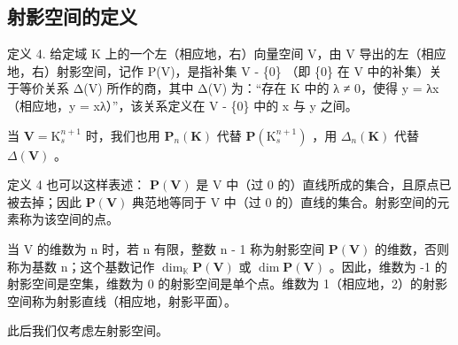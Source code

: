 \subsection{射影空间的定义}

定义 4. 给定域 K 上的一个左（相应地，右）向量空间 V，由 V 导出的左（相应地，右）射影空间，记作 P(V)，是指补集 V - \{0\} （即 \{0\} 在 V 中的补集）关于等价关系 Δ(V) 所作的商，其中 Δ(V) 为：“存在 K 中的 λ ≠ 0，使得 y = λx（相应地，y = xλ）”，该关系定义在 V - \{0\} 中的 x 与 y 之间。

当 \(\mathbf{V} = \mathrm{K}_s^{n + 1}\) 时，我们也用 \(\mathbf{P}_n(\mathbf{K})\) 代替 \(\mathbf{P}(\mathrm{K}_s^{n + 1})\) ，用 \(\Delta_n(\mathbf{K})\) 代替 \(\Delta (\mathbf{V})\) 。

定义 4 也可以这样表述： \(\mathbf{P}(\mathbf{V})\) 是 V 中（过 0 的）直线所成的集合，且原点已被去掉；因此 \(\mathbf{P}(\mathbf{V})\) 典范地等同于 V 中（过 0 的）直线的集合。射影空间的元素称为该空间的点。

当 V 的维数为 n 时，若 n 有限，整数 n - 1 称为射影空间 \(\mathbf{P}(\mathbf{V})\) 的维数，否则称为基数 n；这个基数记作 \(\dim_{\mathbb{K}} \mathbf{P}(\mathbf{V})\) 或 \(\dim \mathbf{P}(\mathbf{V})\) 。因此，维数为 -1 的射影空间是空集，维数为 0 的射影空间是单个点。维数为 1（相应地，2）的射影空间称为射影直线（相应地，射影平面）。

此后我们仅考虑左射影空间。

